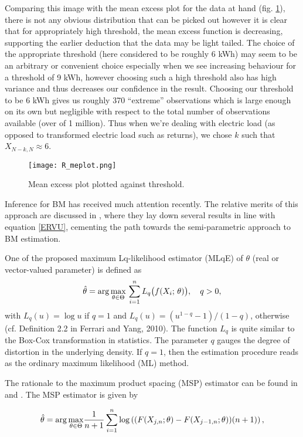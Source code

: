 Comparing this image with the mean excess plot for the data at hand (fig. \ref{fig:r_me}), there is not any obvious distribution that can be picked out however it is clear that for appropriately high threshold, the mean excess function is decreasing, supporting the earlier deduction that the data may be light tailed. The choice of the appropriate threshold (here considered to be roughly 6 kWh) may seem to be an arbitrary or convenient choice especially when we see increasing behaviour for a threshold of 9 kWh, however choosing such a high threshold also has high variance and thus decreases our confidence in the result. Choosing our threshold to be 6 kWh gives us roughly 370 ``extreme'' observations which is large enough on its own but negligible with respect to the total number of observations available (over of 1 million). Thus when we're dealing with electric load (as opposed to transformed electric load such as returns), we chose $k$ such that $X_{N-k,N} \approx 6$.

\begin{figure}
\centering
\texttt{[image: R\_meplot.png]}
\caption{\label{fig:r_me} Mean excess plot plotted against threshold.}
\end{figure}


Inference for BM has received much attention recently. The relative merits of this approach are discussed in \cite{FdeH:15}, where they lay down several results in line with equation \ref{ERVU}, cementing the path towards the semi-parametric approach to BM estimation.

One of the proposed maximum Lq-likelihood estimator (MLqE) of $\theta$ (real or vector-valued parameter) is defined as
\begin{equation*}
	\hat{\theta}= \displaystyle {\arg\max_{\theta \in \Theta}} \, \sum\limits_{i=1}^{n} L_q\bigl( f(X_i; \, \theta)\bigr), \quad q>0,
\end{equation*}
with $L_q(u)= \log u$ if $q=1$ and $L_q(u)= (u^{1-q}- 1)/(1-q)$, otherwise (cf. Definition 2.2 in Ferrari and Yang, 2010). The function $L_q$ is quite similar to the Box-Cox transformation in statistics. The parameter $q$ gauges the degree of distortion in the underlying density. If $q=1$, then the estimation procedure reads as the ordinary maximum likelihood (ML) method.

The rationale to the maximum product spacing (MSP) estimator can be found in \cite{ChengAmin:79} and \cite{Ranneby:84}. The MSP estimator is given by

\begin{equation*}
\hat{\theta} = \displaystyle {\arg\max_{\theta \in \Theta}} \frac{1}{n+1} \sum\limits_{i=1}^{n} \log \left( (F(X_{j,n};\theta) - F(X_{j-1,n};\theta))(n+1) \right),
\end{equation*}


